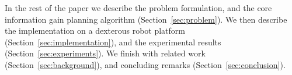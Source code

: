 In the rest of the paper we describe the problem formulation, and the core information gain planning algorithm (Section~\ref{sec:problem}). We then describe the implementation on a dexterous robot platform (Section~\ref{sec:implementation}), and the experimental results (Section~\ref{sec:experiments}). We finish with related work (Section~\ref{sec:background}), and concluding remarks (Section~\ref{sec:conclusion}).

